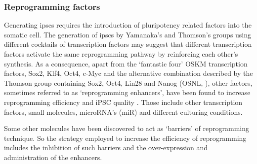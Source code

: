 \subsubsection{Reprogramming factors}

Generating \glspl{ipsc} requires the introduction of pluripotency related factors into the somatic cell. 
The generation of \glspl{ipsc} by Yamanaka’s and Thomson’s groups using different cocktails of transcription factors may suggest that different transcription factors activate the same reprogramming pathway by reinforcing each other’s synthesis.
As a consequence, apart from the `fantastic four' OSKM transcription factors, Sox2, Klf4, Oct4, c-Myc and the alternative combination described by the Thomson group containing Sox2, Oct4, Lin28 and Nanog (OSNL, \cite{yu2007induced}), other factors, sometimes referred to as `reprogramming enhancers', have been found to increase reprogramming efficiency and iPSC quality \cite{takahashi2016decade}.
Those include other transcription factors, small molecules, microRNA’s (miR) and different culturing conditions. 




Some other molecules have been discovered to act as `barriers' of reprogramming technique. 
So the strategy employed to increase the efficiency of reprogramming includes the inhibition of such barriers and the over-expression and administration of the enhancers.


